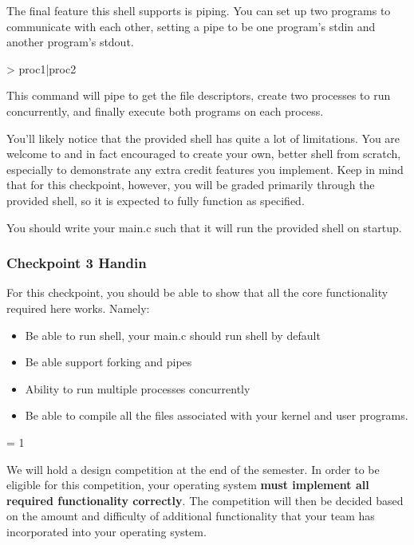 \documentclass{article}
\begin{document}
	The final feature this shell supports is piping. You can set up two programs to communicate with each other, setting a pipe to be one program's {\fix stdin} and another
	program's {\fix stdout}.
	
	{\fix > proc1|proc2}

	This command will pipe to get the file descriptors, create two processes to run concurrently, and finally execute both programs on each process.

	You'll likely notice that the provided shell has quite a lot of limitations. You are welcome to and in fact encouraged to create your own, better shell from scratch, especially to
	demonstrate any extra credit features you implement. Keep in mind that for this checkpoint, however, you will be graded primarily through the provided shell, so it is 
	expected to fully function as specified.
	
	You should write your {\fix main.c} such that it will run the provided shell on startup. 
	\pagebreak

	\subsubsection{Checkpoint 3 Handin}
	
	For this checkpoint, you should be able to show that all the core functionality required here works.
	Namely:

	\begin{itemize}
		\item Be able to run shell, your {\fix main.c} should run shell by default 
		\item Be able support forking and pipes 
		\item Ability to run multiple processes concurrently
		\item Be able to compile all the files associated with your kernel and user programs.
	\end{itemize}

	\vfill
	\pagebreak
\else
\fi


\ifnum\renderec = 1

We will hold a design competition at the end of the semester.
In order to be eligible for this competition, your operating system
	{\bf must implement all required functionality correctly}.  The
competition will then be decided based on the amount and difficulty
of additional functionality that your team has incorporated into
your operating system.
\end{document}
